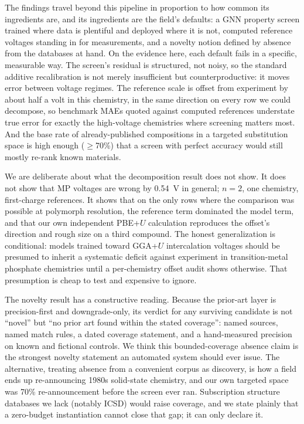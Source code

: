 \documentclass[reprint,aps,prb,amsmath,amssymb,nofootinbib,longbibliography]{revtex4-2}
\begin{document}
The findings travel beyond this pipeline in proportion to how common its
ingredients are, and its ingredients are the field's defaults: a GNN
property screen trained where data is plentiful and deployed where it is
not, computed reference voltages standing in for measurements, and a novelty
notion defined by absence from the databases at hand. On the evidence here,
each default fails in a specific, measurable way. The screen's residual is
structured, not noisy, so the standard additive recalibration is not merely
insufficient but counterproductive: it moves error between voltage
regimes. The reference scale is offset from experiment by about half a volt
in this chemistry, in the same direction on every row we could decompose, so
benchmark MAEs quoted against computed references understate true error for
exactly the high-voltage chemistries where screening matters most. And the
base rate of already-published compositions in a targeted substitution space
is high enough ($\ge$70\%) that a screen with perfect accuracy would still
mostly re-rank known materials.

We are deliberate about what the decomposition result does not show. It
does not show that MP voltages are wrong by \SI{0.54}{\volt} in general;
$n=2$, one chemistry, first-charge references. It shows that on the only
rows where the comparison was possible at polymorph resolution, the
reference term dominated the model term, and that our own independent
PBE+$U$ calculation reproduces the offset's direction and rough size on a
third compound. The honest generalization is conditional: models trained
toward GGA+$U$ intercalation voltages should be presumed to inherit a
systematic deficit against experiment in transition-metal phosphate
chemistries until a per-chemistry offset audit shows otherwise. That
presumption is cheap to test and expensive to ignore.

The novelty result has a constructive reading. Because the prior-art layer
is precision-first and downgrade-only, its verdict for any surviving
candidate is not ``novel'' but ``no prior art found within the stated
coverage'': named sources, named match rules, a dated coverage statement,
and a hand-measured precision on known and fictional controls. We think
this bounded-coverage absence claim is the strongest novelty statement an
automated system should ever issue. The alternative, treating absence
from a convenient corpus as discovery, is how a field ends up
re-announcing 1980s solid-state chemistry, and our own targeted space was
70\% re-announcement before the screen ever ran. Subscription structure
databases we lack (notably ICSD) would raise coverage, and we state plainly
that a zero-budget instantiation cannot close that gap; it can only declare
it.
\end{document}
